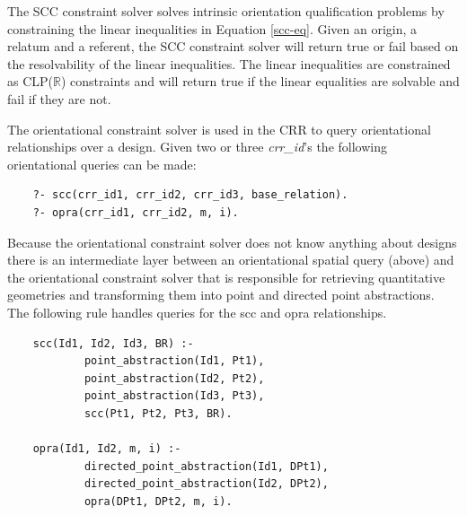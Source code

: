 \documentclass[12pt]{ucthesis}
\begin{document}
The SCC constraint solver solves intrinsic orientation qualification problems by constraining the linear inequalities in Equation \ref{scc-eq}. Given an origin, a relatum and a referent, the SCC constraint solver will return true or fail based on the resolvability of the linear inequalities. The linear inequalities are constrained as CLP($\mathbb{R}$) constraints and will return true if the linear equalities are solvable and fail if they are not.

The orientational constraint solver is used in the CRR to query orientational relationships over a design. Given two or three \emph{crr\_id}'s the following orientational queries can be made: 
\begin{verbatim}
    ?- scc(crr_id1, crr_id2, crr_id3, base_relation).
    ?- opra(crr_id1, crr_id2, m, i).
\end{verbatim} Because the orientational constraint solver does not know anything about designs there is an intermediate layer between an orientational spatial query (above) and the orientational constraint solver that is responsible for retrieving quantitative geometries and transforming them into point and directed point abstractions. The following rule handles queries for the scc and opra relationships.
\begin{verbatim}
    scc(Id1, Id2, Id3, BR) :-
            point_abstraction(Id1, Pt1),
            point_abstraction(Id2, Pt2),
            point_abstraction(Id3, Pt3),
            scc(Pt1, Pt2, Pt3, BR).

    opra(Id1, Id2, m, i) :-
            directed_point_abstraction(Id1, DPt1),
            directed_point_abstraction(Id2, DPt2),
            opra(DPt1, DPt2, m, i).
\end{verbatim}



\end{document}
